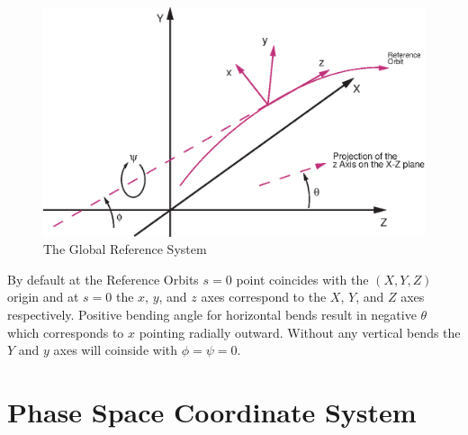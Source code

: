 \begin{figure}
\centering
\includegraphics{global_coords.ps}
\caption{The Global Reference System}
\label{f:global_coords}
\end{figure}

By default at the Reference Orbits $s = 0$ point coincides with the
$(X, Y, Z)$ origin and at $s = 0$ the $x$, $y$, and $z$ axes
correspond to the $X$, $Y$, and $Z$ axes respectively. Positive
bending angle for horizontal bends result in negative $\theta$ which
corresponds to $x$ pointing radially outward. Without any vertical
bends the $Y$ and $y$ axes will coinside with $\phi = \psi = 0$. 

\section{Phase Space Coordinate System}

